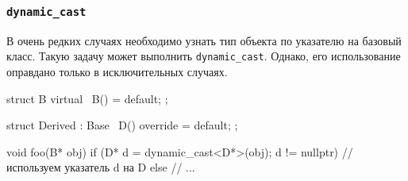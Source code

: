 \documentclass[compress, 8pt]{beamer}
\begin{document}
\begin{frame}[fragile]

    \frametitle{\texttt{dynamic\_cast}}

    \hfill\break
    В очень редких случаях необходимо узнать тип объекта по указателю на
    базовый класс.
    Такую задачу может выполнить \verb|dynamic_cast|.
    Однако, его использование оправдано только в исключительных
    случаях\footnotemark{}.

    \begin{myinplacelisting}[minted language=cpp]
struct B {
    virtual ~B() = default;
};

struct Derived : Base {
    ~D() override = default;
};

void foo(B* obj) {
    if (D* d = dynamic_cast<D*>(obj); d != nullptr) {
        // используем указатель d на D
    }
    else {
        // ...
    }
}
    \end{myinplacelisting}


\end{frame}
\end{document}
